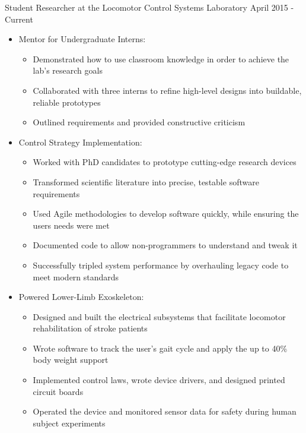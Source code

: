 Student Researcher at the Locomotor Control Systems Laboratory
\hfill
April 2015 - Current
\begin{itemize}
    \item Mentor for Undergraduate Interns:
    \begin{itemize}
        \item Demonstrated how to use classroom knowledge in order to achieve the lab's research goals
        \item Collaborated with three interns to refine high-level designs into buildable, reliable prototypes
        \item Outlined requirements and provided constructive criticism
    \end{itemize}
    \item Control Strategy Implementation:
    \begin{itemize}
        \item Worked with PhD candidates to prototype cutting-edge research devices
        \item Transformed scientific literature into precise, testable software requirements
        \item Used Agile methodologies to develop software quickly, while ensuring the user\textsc{}s needs were met
        \item Documented code to allow non-programmers to understand and tweak it
        \item Successfully tripled system performance by overhauling legacy code to meet modern standards
    \end{itemize}
    \item Powered Lower-Limb Exoskeleton:
    \begin{itemize}
        \item Designed and built the electrical subsystems that facilitate locomotor rehabilitation of stroke patients %
        \item Wrote software to track the user’s gait cycle and apply the up to 40\% body weight support
        \item Implemented control laws, wrote device drivers, and designed printed circuit boards
        \item Operated the device and monitored sensor data for safety during human subject experiments
    \end{itemize}
\end{itemize}
